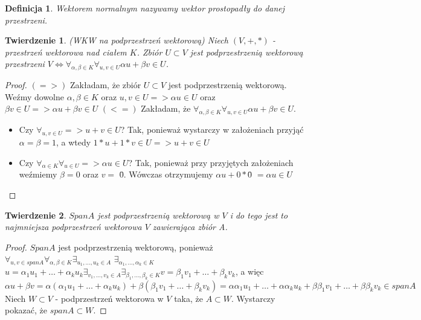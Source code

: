\documentclass[12pt,a4paper]{article}
\newtheorem{df}{Definicja}[section]
\newtheorem{twr}{Twierdzenie}[section]
\begin{document}
\begin{df}
Wektorem normalnym nazywamy wektor prostopad{\l}y do danej przestrzeni.
\end{df}
\begin{twr}
(WKW na podprzestrze\'{n} wektorow\k{a}) \newline Niech  $(V, +, *)$ - przestrze\'{n} wektorowa nad cia{\l}em $K$. Zbi\'{o}r $U \subset V$ jest podprzestrzeni\k{a} wektorow\k{a} przestrzeni $V \Leftrightarrow \forall_{\alpha, \beta \in K} \forall_{u, v \in U} \alpha u + \beta v \in U$.
\end{twr}
\begin{proof}
$(=>)$ Zak{\l}adam, \.{z}e zbi\'{o}r $U \subset V$ jest podprzestrzeni\k{a} wektorow\k{a}. We\'{z}my dowolne $\alpha, \beta \in K$ oraz $u, v \in U => \alpha u \in U$ oraz $\beta v \in U => \alpha u + \beta v \in U$
\newline
$(<=)$ Zak{\l}adam, \.{z}e $\forall_{\alpha, \beta \in K} \forall_{u, v \in U} \alpha u + \beta v \in U$.
\begin{itemize}
\item Czy $\forall_{u, v \in U} => u+v \in U$? Tak, poniewa\.{z} wystarczy w za{\l}o\.{z}eniach przyj\k{a}\'{c} $\alpha = \beta = 1$, a wtedy $1*u+1*v \in U => u + v \in U$
\item Czy $\forall_{\alpha \in K} \forall_{u \in U} => \alpha u \in U$? Tak, poniewa\.{z} przy przyj\k{e}tych za{\l}o\.{z}eniach we\'{z}miemy $\beta = 0$ oraz $v =$ \={0}. W\'{o}wczas otrzymujemy $\alpha u + 0 *$\={0} $= \alpha u \in U$
\end{itemize}
\end{proof}

\begin{twr}
$Span A$ jest podprzestrzeni\k{a} wektorow\k{a} w $V$ i do tego jest to najmniejsza podprzestrze\'{n} wektorowa $V$ zawieraj\k{a}ca zbi\'{o}r A.
\end{twr}
\begin{proof}
$Span A$ jest podprzestrzeni\k{a} wektorow\k{a}, poniewa\.{z} \newline $\forall_{u, v \in span A} \forall_{\alpha, \beta \in K} \exists_{u_{1}, \dots, u_{k} \in A}$ $ \exists_{\alpha_{1}, \dots, \alpha_{k} \in K}$ $u = \alpha_{1}u_{1} + \dots + \alpha_{k}u_{k} \exists_{v_{1}, \dots, v_{k} \in A} \exists_{\beta_{1}, \dots, \beta_{k} \in K} v = \beta_{1}v_{1}  + \dots + \beta_{k}v_{k}$, a wi\k{e}c $\alpha u + \beta v = \alpha (\alpha_{1}u_{1} + \dots + \alpha_{k}u_{k}) + \beta (\beta_{1}v_{1} + \dots + \beta_{k}v_{k}) = \alpha \alpha_{1}u_{1}  + \dots + \alpha \alpha_{k}u_{k} + \beta \beta_{1}v_{1} + \dots + \beta \beta_{k}v_{k} \in span A$ \newline
Niech $W \subset V$ - podprzestrze\'{n} wektorowa w $V$ taka, \.{z}e $A \subset W$. Wystarczy pokaza\'{c}, \.{z}e $span A \subset W$.
\end{proof}
\end{document}
